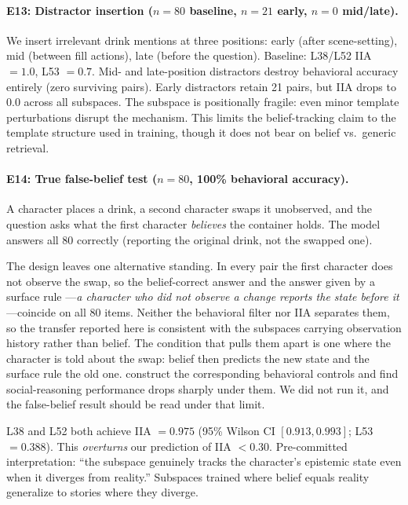 \documentclass{article}
\begin{document}
\paragraph{E13: Distractor insertion ($n = 80$ baseline, $n = 21$ early, $n = 0$ mid/late).}
We insert irrelevant drink mentions at three positions: early (after scene-setting), mid (between fill actions), late (before the question). Baseline: L38/L52 IIA $= 1.0$, L53 $= 0.7$. Mid- and late-position distractors destroy behavioral accuracy entirely (zero surviving pairs). Early distractors retain 21 pairs, but IIA drops to $0.0$ across all subspaces. The subspace is positionally fragile: even minor template perturbations disrupt the mechanism. This limits the belief-tracking claim to the template structure used in training, though it does not bear on belief vs.\ generic retrieval.

\paragraph{E14: True false-belief test ($n = 80$, 100\% behavioral accuracy).}
A character places a drink, a second character swaps it unobserved, and the question asks what the first character \emph{believes} the container holds. The model answers all 80 correctly (reporting the original drink, not the swapped one).

The design leaves one alternative standing. In every pair the first character does not
observe the swap, so the belief-correct answer and the answer given by a surface rule
---\emph{a character who did not observe a change reports the state before it}---coincide on
all 80 items. Neither the behavioral filter nor IIA separates them, so the transfer reported
here is consistent with the subspaces carrying observation history rather than belief. The
condition that pulls them apart is one where the character is told about the swap:
belief then predicts the new state and the surface rule the old one. \citet{shapira2024clever}
construct the corresponding behavioral controls and find social-reasoning performance drops
sharply under them. We did not run it, and the false-belief result should be read under that
limit.

L38 and L52 both achieve IIA $= 0.975$ (95\% Wilson CI $[0.913, 0.993]$; L53 $= 0.388$). This \emph{overturns} our prediction of IIA $< 0.30$. Pre-committed interpretation: ``the subspace genuinely tracks the character's epistemic state even when it diverges from reality.'' Subspaces trained where belief equals reality generalize to stories where they diverge.
\end{document}
